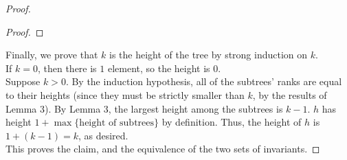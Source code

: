 \documentclass{article}
\begin{document}
\begin{proof}
\begin{proof}
\end{proof}
Finally, we prove that $k$ is the height of the tree by strong induction on $k$.
\\If $k=0$, then there is $1$ element, so the height is 0.
\\Suppose $k>0$. By the induction hypothesis, all of the subtrees' ranks are equal to their heights (since they must be strictly smaller than $k$, by the results of Lemma 3). By Lemma 3, the largest height among the subtrees is $k-1$. $h$ has height $1 + \max\lbrace \text{height of subtrees}\rbrace$ by definition. Thus, the height of $h$ is $1+(k-1) = k$, as desired.
\\This proves the claim, and the equivalence of the two sets of invariants.
\end{proof}
\end{document}
